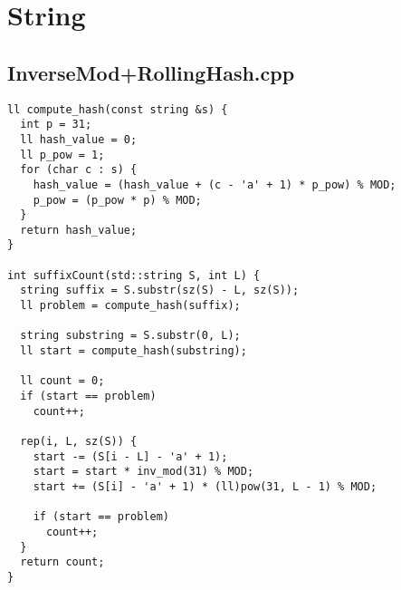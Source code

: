 \documentclass[10pt]{article}
\begin{document}
\begin{multicols*}{3}
\begin{lstlisting}
\end{lstlisting}
\section*{String}
\nopagebreak[4]
\subsection*{InverseMod+RollingHash.cpp}
\nopagebreak[4]
\begin{lstlisting}
ll compute_hash(const string &s) {
  int p = 31;
  ll hash_value = 0;
  ll p_pow = 1;
  for (char c : s) {
    hash_value = (hash_value + (c - 'a' + 1) * p_pow) % MOD;
    p_pow = (p_pow * p) % MOD;
  }
  return hash_value;
}

int suffixCount(std::string S, int L) {
  string suffix = S.substr(sz(S) - L, sz(S));
  ll problem = compute_hash(suffix);

  string substring = S.substr(0, L);
  ll start = compute_hash(substring);

  ll count = 0;
  if (start == problem)
    count++;

  rep(i, L, sz(S)) {
    start -= (S[i - L] - 'a' + 1);
    start = start * inv_mod(31) % MOD;
    start += (S[i] - 'a' + 1) * (ll)pow(31, L - 1) % MOD;

    if (start == problem)
      count++;
  }
  return count;
}

\end{lstlisting}
\end{multicols*}
\end{document}
